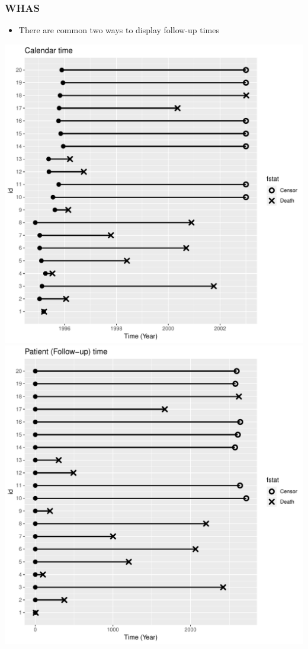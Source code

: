\documentclass[10pt]{beamer}\usepackage[]{graphicx}\usepackage[]{color}
\begin{document}
\begin{frame}[fragile]
\frametitle{WHAS}
  \begin{itemize}
  \item There are common two ways to display follow-up times
  \end{itemize}
  \begin{center}
    \includegraphics[scale = .3]{tab1-1-1}\hspace{.5cm}
    \includegraphics[scale = .3]{tab1-1-2}
  \end{center}
\end{frame}
\end{document}
